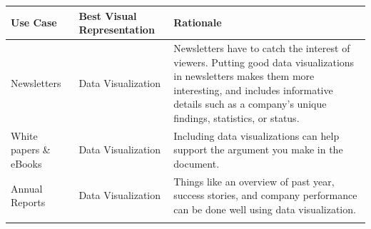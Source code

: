 \documentclass[]{book}
\begin{document}
\begin{longtable}[]{@{}lll@{}}
\toprule
\begin{minipage}[b]{0.13\columnwidth}\raggedright
Use Case\strut
\end{minipage} & \begin{minipage}[b]{0.18\columnwidth}\raggedright
Best Visual Representation\strut
\end{minipage} & \begin{minipage}[b]{0.60\columnwidth}\raggedright
Rationale\strut
\end{minipage}\tabularnewline
\midrule
\endhead
\begin{minipage}[t]{0.13\columnwidth}\raggedright
Newsletters\strut
\end{minipage} & \begin{minipage}[t]{0.18\columnwidth}\raggedright
Data Visualization\strut
\end{minipage} & \begin{minipage}[t]{0.60\columnwidth}\raggedright
Newsletters have to catch the interest of viewers. Putting good data visualizations in newsletters makes them more interesting, and includes informative details such as a company's unique findings, statistics, or status.\strut
\end{minipage}\tabularnewline
\begin{minipage}[t]{0.13\columnwidth}\raggedright
White papers \& eBooks\strut
\end{minipage} & \begin{minipage}[t]{0.18\columnwidth}\raggedright
Data Visualization\strut
\end{minipage} & \begin{minipage}[t]{0.60\columnwidth}\raggedright
Including data visualizations can help support the argument you make in the document.\strut
\end{minipage}\tabularnewline
\begin{minipage}[t]{0.13\columnwidth}\raggedright
Annual Reports\strut
\end{minipage} & \begin{minipage}[t]{0.18\columnwidth}\raggedright
Data Visualization\strut
\end{minipage} & \begin{minipage}[t]{0.60\columnwidth}\raggedright
Things like an overview of past year, success stories, and company performance can be done well using data visualization.\strut
\end{minipage}\tabularnewline
\begin{minipage}[t]{0.13\columnwidth}\raggedright

\end{minipage}
\end{longtable}
\end{document}
